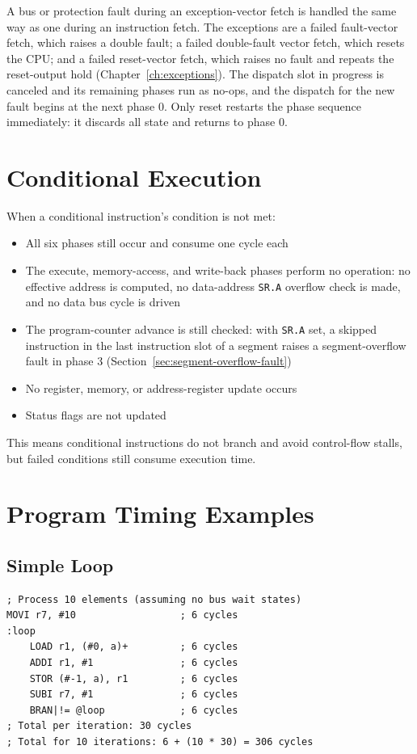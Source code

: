 A bus or protection fault during an exception-vector fetch is handled the same way as one during an instruction fetch.
The exceptions are a failed fault-vector fetch, which raises a double fault; a failed double-fault vector fetch, which
resets the CPU; and a failed reset-vector fetch, which raises no fault and repeats the reset-output hold
(Chapter~\ref{ch:exceptions}). The dispatch slot in progress is canceled and its remaining phases run as no-ops, and
the dispatch for the new fault begins at the next phase 0. Only reset restarts the phase sequence immediately: it
discards all state and returns to phase 0.

\section{Conditional Execution}

When a conditional instruction's condition is not met:
\begin{itemize}
	\item All six phases still occur and consume one cycle each
	\item The execute, memory-access, and write-back phases perform no operation: no effective address is computed, no
	      data-address \texttt{SR.A} overflow check is made, and no data bus cycle is driven
	\item The program-counter advance is still checked: with \texttt{SR.A} set, a skipped instruction in the last instruction
	      slot of a segment raises a segment-overflow fault in phase 3 (Section~\ref{sec:segment-overflow-fault})
	\item No register, memory, or address-register update occurs
	\item Status flags are not updated
\end{itemize}

This means conditional instructions do not branch and avoid control-flow stalls, but failed conditions still consume
execution time.

\section{Program Timing Examples}

\subsection{Simple Loop}
\begin{lstlisting}
; Process 10 elements (assuming no bus wait states)
MOVI r7, #10                  ; 6 cycles
:loop
    LOAD r1, (#0, a)+         ; 6 cycles
    ADDI r1, #1               ; 6 cycles
    STOR (#-1, a), r1         ; 6 cycles
    SUBI r7, #1               ; 6 cycles
    BRAN|!= @loop             ; 6 cycles
; Total per iteration: 30 cycles
; Total for 10 iterations: 6 + (10 * 30) = 306 cycles
\end{lstlisting}

